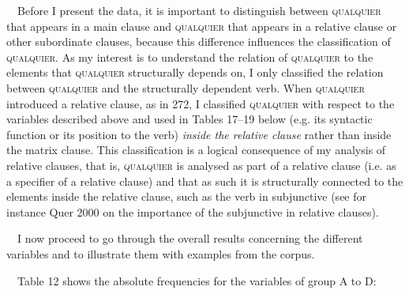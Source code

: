 \begin{styleStandard}
\ \ Before I present the data, it is important to distinguish between \textsc{qualquier} that appears in a main clause and \textsc{qualquier} that appears in a relative clause or other subordinate clauses, because this difference influences the classification of \textsc{qualquier}. As my interest is to understand the relation of \textsc{qualquier} to the elements that \textsc{qualquier} structurally depends on, I only classified the relation between \textsc{qualquier} and the structurally dependent verb. When \textsc{qualquier} introduced a relative clause, as in 272, I classified \textsc{qualquier} with respect to the variables described above and used in Tables 17–19 below (e.g. its syntactic function or its position to the verb) \textit{inside the relative clause} rather than inside the matrix clause. This classification is a logical consequence of my analysis of relative clauses, that is, \textsc{qualquier} is analysed as part of a relative clause (i.e. as a specifier of a relative clause) and that as such it is structurally connected to the elements inside the relative clause, such as the verb in subjunctive (see for instance Quer 2000 on the importance of the subjunctive in relative clauses).
\end{styleStandard}

\begin{styleStandard}
\ \ I now proceed to go through the overall results concerning the different variables and to illustrate them with examples from the corpus.
\end{styleStandard}

\begin{styleStandard}
\ \ Table 12 shows the absolute frequencies for the variables of group A to D:
\end{styleStandard}

